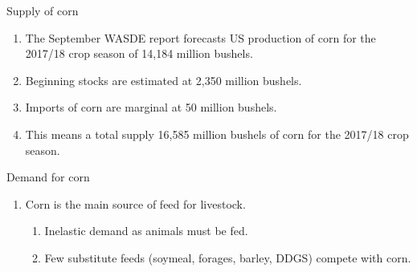 \documentclass[table,xcolor=pdftex,dvipsnames, handout]{beamer}\usepackage[]{graphicx}\usepackage[]{color}
\begin{document}

\begin{frame}{Supply of corn}
\begin{enumerate}[label=\textbullet]
  \item The September WASDE report forecasts US production of corn for the 2017/18 crop season of 14,184 million bushels.
  \item Beginning stocks are estimated at 2,350 million bushels.
  \item Imports of corn are marginal at 50 million bushels.
  \item This means a total supply 16,585 million bushels of corn for the 2017/18 crop season.
\end{enumerate}
\end{frame}


\begin{frame}{Demand for corn}
\begin{enumerate}[label=\textbullet]
  \item Corn is the main source of feed for livestock.
      \begin{enumerate}[label=-]
         \item Inelastic demand as animals must be fed.
         \item Few substitute feeds (soymeal, forages, barley, DDGS) compete with corn.
      \end{enumerate}
\end{enumerate}
\end{frame}


\end{document}
